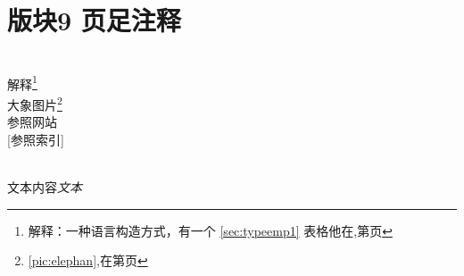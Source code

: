 \documentclass[a4paper,12pt,landscape]{book}
\begin{document}
\section{版块9 页足注释}
\blindtext[1] \\ 

解释\footnote[1]{解释：一种语言构造方式，有一个 \ref{sec:typeemp1} 表格他在,第{\pageref{sec:typeemp1}}页} \\
大象图片\footnote{\ref{pic:elephan},在第{\pageref{pic:elephan}}页}\\
参照网站\cite{网站} \\
[参照索引] \\
\blindtext[1]\\
\clearpage
{}
\printindex
\begin{thebibliography}{book}
	文本内容\emph{文本}
\end{thebibliography}
\end{document}
